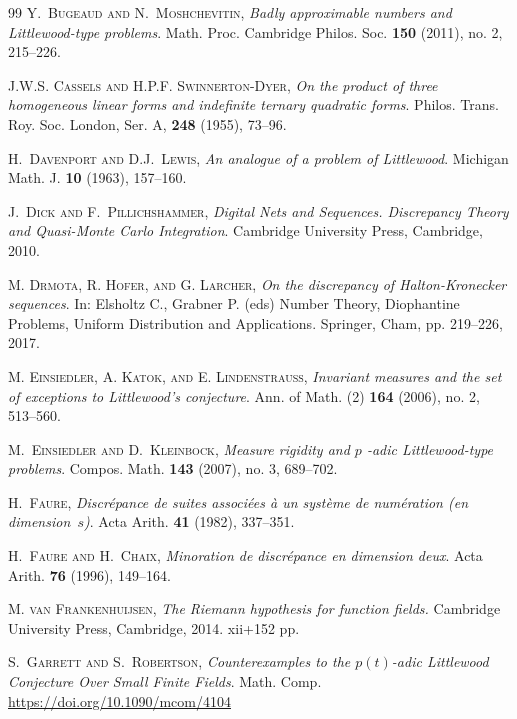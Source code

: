\documentclass{article}
\renewcommand{\(}{\left (}
\renewcommand{\)}{\right )}
\theoremstyle{definition}
\numberwithin{equation}{section}
\begin{document}
\begin{thebibliography}{99}
\textsc{Y.~Bugeaud and N.~Moshchevitin},
\textit{Badly approximable numbers and Littlewood-type problems}.
Math. Proc. Cambridge Philos. Soc. {\bf150} (2011), no. 2, 215--226.

 \textsc{J.W.S. Cassels and H.P.F. Swinnerton-Dyer}, \textit{On the product of three homogeneous linear forms and indefinite ternary quadratic forms}. Philos. Trans. Roy. Soc. London, Ser. A, {\bf248} (1955), 73--96. 

 \textsc{H.~Davenport and D.J.~Lewis}, \textit{An analogue of a problem of Littlewood}. Michigan Math. J. {\bf10} (1963), 157--160.

\textsc{J.~Dick and F.~Pillichshammer}, {\textit{Digital Nets and Sequences. Discrepancy Theory and Quasi-Monte Carlo Integration}}.
Cambridge University Press, Cambridge, 2010.


 \textsc{M. Drmota, R. Hofer, and G. Larcher}, \textit{On the discrepancy of Halton-Kronecker sequences}. In: Elsholtz C., Grabner P. (eds) Number Theory, Diophantine Problems, Uniform Distribution and Applications. Springer, Cham, pp. 219--226, 2017. 


\textsc{M. Einsiedler, A. Katok, and E. Lindenstrauss}, {\it Invariant measures and the set of exceptions to Littlewood's conjecture}.
Ann. of Math. (2) {\bf164} (2006), no. 2, 513--560.

 \textsc{M.~Einsiedler and D.~Kleinbock}, \textit{Measure rigidity and  $p$ -adic Littlewood-type problems}.
Compos. Math. {\bf143} (2007), no. 3, 689--702.

 \textsc{H.~Faure},  \textit{Discr\'epance de suites associ\'ees \`a
un syst\`eme de num\'eration (en dimension~$s$)}. {Acta Arith.} {{\bf41}} (1982), 337--351.

 \textsc{H.~Faure and H.~Chaix}, 
\textit{Minoration de discr\'{e}pance en dimension deux}.
{Acta Arith.} {\bf76} (1996), 149--164.

 \textsc{M. van Frankenhuijsen},
\textit{The Riemann hypothesis for function fields.}
Cambridge University Press, Cambridge, 2014. xii+152 pp.

 \textsc{S.~Garrett and S.~Robertson}, \textit{Counterexamples to the $p(t)$-adic Littlewood Conjecture Over Small Finite Fields}. Math. Comp. \url{https://doi.org/10.1090/mcom/4104}


\end{thebibliography}
\end{document}
